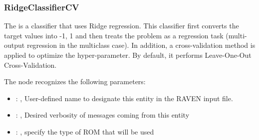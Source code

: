 \subsubsection{RidgeClassifierCV}
  The  is a classifier that uses Ridge regression.
  This classifier first converts the target values into {-1, 1} and then treats
  the problem as a regression task (multi-output regression in the multiclass case).
  In addition, a cross-validation method is applied to optimize the hyper-parameter.
  By default, it performs Leave-One-Out Cross-Validation.

  The  node recognizes the following parameters:
    \begin{itemize}
      \item {}: ,
        User-defined name to designate this entity in the RAVEN input file.
      \item {}: ,
        Desired verbosity of messages coming from this entity
      \item {}: ,
        specify the type of ROM that will be used
  \end{itemize}

